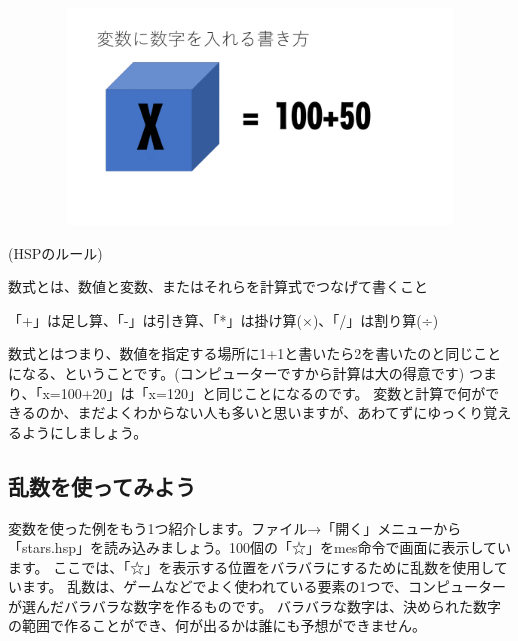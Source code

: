 \begin{figure}[H]
    \begin{center}
        \includegraphics[keepaspectratio,width=11.695cm,height=5.741cm]{text02-img/text02-img046.png}
    \end{center}
\end{figure}

\begin{description}
    \item (HSPのルール)
\end{description}

\begin{description}
    \item 数式とは、数値と変数、またはそれらを計算式でつなげて書くこと
    \item 「+」は足し算、「-」は引き算、「*」は掛け算(×)、「/」は割り算(÷) 
\end{description}

数式とはつまり、数値を指定する場所に1+1と書いたら2を書いたのと同じことになる、ということです。(コンピューターですから計算は大の得意です)
つまり、「x=100+20」は「x=120」と同じことになるのです。
変数と計算で何ができるのか、まだよくわからない人も多いと思いますが、あわてずにゆっくり覚えるようにしましょう。

\subsection{乱数を使ってみよう}

変数を使った例をもう1つ紹介します。ファイル→「開く」メニューから「stars.hsp」を読み込みましょう。100個の「☆」をmes命令で画面に表示しています。
ここでは、「☆」を表示する位置をバラバラにするために乱数を使用しています。
乱数は、ゲームなどでよく使われている要素の1つで、コンピューターが選んだバラバラな数字を作るものです。
バラバラな数字は、決められた数字の範囲で作ることができ、何が出るかは誰にも予想ができません。

